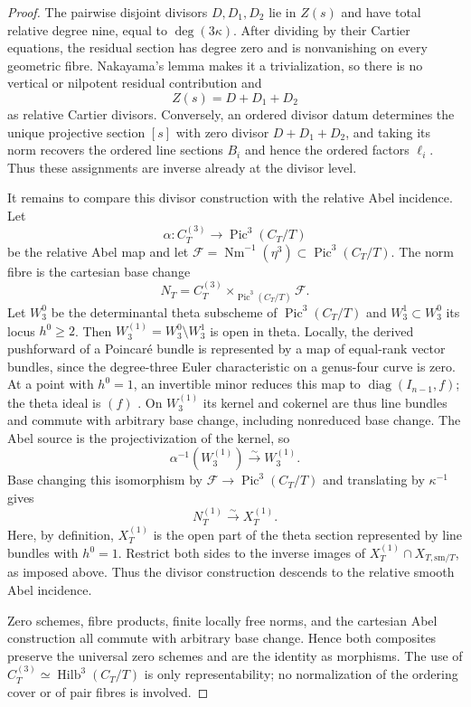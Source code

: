 \documentclass[10pt]{amsart}
\numberwithin{equation}{section}
\theoremstyle{definition}
\theoremstyle{remark}
\newcommand{\Nm}{\operatorname{Nm}}
\begin{document}
\begin{proof}
The pairwise disjoint divisors $D,D_1,D_2$ lie in $Z(s)$ and have total
relative degree nine, equal to $\deg(3\kappa)$.  After dividing by their
Cartier equations, the residual section has degree zero and is nonvanishing
on every geometric fibre.  Nakayama's lemma makes it a trivialization, so
there is no vertical or nilpotent residual contribution and
\begin{equation}
 Z(s)=D+D_1+D_2
\label{eq:relative-zero-sum}
\end{equation}
as relative Cartier divisors.  Conversely, an ordered divisor datum
determines the unique projective section $[s]$ with zero divisor
$D+D_1+D_2$, and taking its norm recovers the ordered line sections $B_i$
and hence the ordered factors $\ell_i$.  Thus these assignments are inverse
already at the divisor level.

It remains to compare this divisor construction with the relative Abel
incidence.  Let
\[
 \alpha:C_T^{(3)}\longrightarrow\operatorname{Pic}^3(C_T/T)
\]
be the relative Abel map and let
$\mathcal F=\Nm^{-1}(\eta^3)\subset\operatorname{Pic}^3(C_T/T)$.  The norm fibre is
the cartesian base change
\[
 N_T=C_T^{(3)}\times_{\operatorname{Pic}^3(C_T/T)}\mathcal F.
\]
Let $W_3^0$ be the determinantal theta subscheme of
$\operatorname{Pic}^3(C_T/T)$ and $W_3^1\subset W_3^0$ its locus $h^0\ge2$.
Then $W_3^{(1)}=W_3^0\setminus W_3^1$ is open in theta.
Locally, the derived pushforward of a Poincar\'e bundle is represented by
a map of equal-rank vector bundles, since the degree-three Euler
characteristic on a genus-four curve is zero.  At a point with $h^0=1$,
an invertible minor reduces this map to
$\operatorname{diag}(I_{n-1},f)$; the theta ideal is $(f)$
\cite{Kempf1973}.  On $W_3^{(1)}$ its kernel and cokernel are thus line
bundles and commute with arbitrary base change, including nonreduced base
change.  The Abel source is the projectivization of the kernel, so
\[
 \alpha^{-1}(W_3^{(1)})\xrightarrow{\sim}W_3^{(1)}.
\]
Base changing this isomorphism by
$\mathcal F\to\operatorname{Pic}^3(C_T/T)$ and
translating by $\kappa^{-1}$ gives
\[
 N_T^{(1)}\xrightarrow{\sim}X_T^{(1)}.
\]
Here, by definition, $X_T^{(1)}$ is the open part of the theta section
represented by line bundles with $h^0=1$.
Restrict both sides to the inverse images of
$X_T^{(1)}\cap X_{T,\mathrm{sm}/T}$, as imposed above.  Thus the divisor
construction descends to the relative smooth Abel incidence.

Zero schemes, fibre products, finite locally free norms, and the cartesian
Abel construction all commute with arbitrary base change.  Hence both
composites preserve the universal zero schemes and are the identity as
morphisms.  The use of $C_T^{(3)}\simeq\operatorname{Hilb}^3(C_T/T)$ is only
representability; no normalization of the ordering cover or of pair fibres
is involved.
\end{proof}
\end{document}
